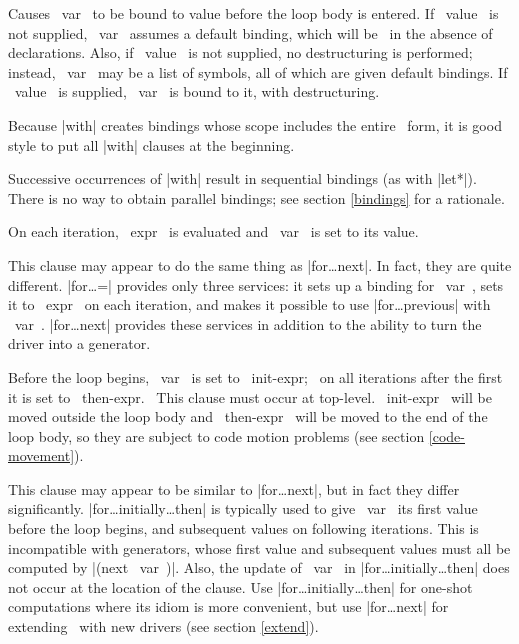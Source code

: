 \begin{clauses}

Causes ~var~ to be bound to value before the loop body is entered.
If ~value~ is not supplied, ~var~ assumes a default
binding, which will be 
\nil\ in the absence of declarations.  Also, if ~value~ is not
supplied, no destructuring is performed; instead, ~var~ may be a list of
symbols, all of which are given default 
bindings.  If ~value~ is supplied, ~var~ is bound to it, with
destructuring.  

\cpar Because |with|
creates bindings whose scope includes the entire \iter\ form, it is
good style to put all |with| clauses at the beginning.

\cpar Successive occurrences of |with| result in sequential
bindings (as with 
|let*|).  There is no way to obtain parallel bindings; see
section \ref{bindings} for a rationale.  


On each iteration, ~expr~ is evaluated and ~var~ is set
to its value. 

\cpar This clause may appear to do the same thing as |for\dots next|.
In fact, they are quite different.  |for\dots =| provides only three
services: it sets up a binding for ~var~, sets it to ~expr~ on each
iteration, and makes it possible to use |for\dots previous| with
~var~.  |for\dots next| provides these services in addition to the
ability to turn the driver into a generator.

Before the loop begins, ~var~ is set to ~init-expr;~ on all
iterations after the first it is set to ~then-expr.~  This clause
must occur at top-level.  ~init-expr~ will be moved outside the loop
body and ~then-expr~ will be moved to the end of the loop body, so
they are subject to code motion problems (see section
\ref{code-movement}). 

\cpar This clause may appear to be similar to |for\dots next|, but in
fact they differ significantly.  |for\dots initially\dots then| is
typically used to give ~var~ its first value before the loop begins,
and subsequent values on following iterations.  This is incompatible
with generators, whose first value and subsequent values must all be
computed by |(next ~var~)|.  Also, the update of ~var~ in 
|for\dots initially\dots then| does not occur at the location of the
clause. 
Use |for\dots initially\dots then| for
one-shot computations where its idiom is more convenient, but use
|for\dots next| for extending \iter\ with new drivers (see section
\ref{extend}).


\end{clauses}
